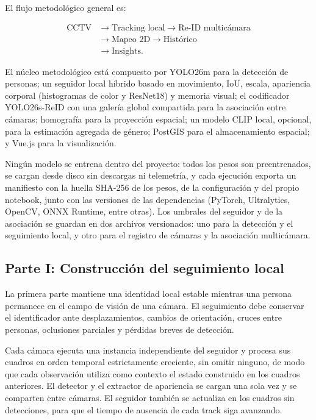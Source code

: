 \documentclass[12pt,letterpaper]{article}
\begin{document}
El flujo metodológico general es:

\begin{equation}
\begin{aligned}
\text{CCTV}
&\rightarrow \text{Tracking local}
\rightarrow \text{Re-ID multicámara} \\
&\rightarrow \text{Mapeo 2D}
\rightarrow \text{Histórico} \\
&\rightarrow \text{Insights}.
\end{aligned}
\end{equation}

El núcleo metodológico está compuesto por YOLO26m para la detección de
personas; un seguidor local híbrido basado en movimiento, IoU, escala,
apariencia corporal (histogramas de color y ResNet18) y memoria visual;
el codificador YOLO26s-ReID con una galería global compartida para la
asociación entre cámaras; homografía para la proyección espacial; un
modelo CLIP local, opcional, para la estimación agregada de género;
PostGIS para el almacenamiento espacial; y Vue.js para la visualización.

Ningún modelo se entrena dentro del proyecto: todos los pesos son
preentrenados, se cargan desde disco sin descargas ni telemetría, y cada
ejecución exporta un manifiesto con la huella SHA-256 de los pesos, de la
configuración y del propio notebook, junto con las versiones de las
dependencias (PyTorch, Ultralytics, OpenCV, ONNX Runtime, entre otras).
Los umbrales del seguidor y de la asociación se guardan en dos archivos
versionados: uno para la detección y el seguimiento local, y otro para
el registro de cámaras y la asociación multicámara.

\subsection{Parte I: Construcción del seguimiento local}

La primera parte mantiene una identidad local estable mientras una
persona permanece en el campo de visión de una cámara. El seguimiento
debe conservar el identificador ante desplazamientos, cambios de
orientación, cruces entre personas, oclusiones parciales y pérdidas
breves de detección.

Cada cámara ejecuta una instancia independiente del seguidor y procesa
sus cuadros en orden temporal estrictamente creciente, sin omitir
ninguno, de modo que cada observación utiliza como contexto el estado
construido en los cuadros anteriores. El detector y el extractor de
apariencia se cargan una sola vez y se comparten entre cámaras. El
seguidor también se actualiza en los cuadros sin detecciones, para que
el tiempo de ausencia de cada track siga avanzando.
\end{document}

